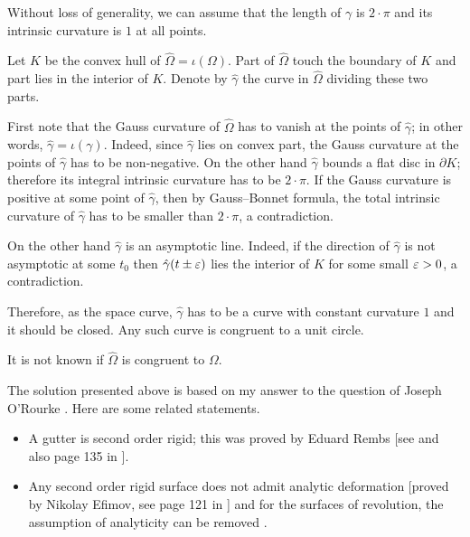 Without loss of generality, we can assume that the length of $\gamma$ is $2{\cdot}\pi$ and its intrinsic curvature is $1$ at all points.

Let $K$ be the convex hull of $\hat\Omega=\iota(\Omega)$.
Part of $\hat\Omega$ touch the boundary of $K$ and part lies in the interior of $K$. 
Denote by $\hat\gamma$ the curve in $\hat\Omega$ dividing these two parts.

First note that the Gauss curvature of $\hat\Omega$ has to vanish at the points of $\hat\gamma$;
in other words, $\hat\gamma=\iota(\gamma)$.
Indeed, since $\hat\gamma$ lies on convex part, 
the Gauss curvature at the points of $\hat\gamma$ has to be non-negative. 
On the other hand $\hat\gamma$ bounds a flat disc in $\partial K$;
therefore its integral intrinsic curvature has to be $2{\cdot}\pi$.
If the Gauss curvature is positive at some point of $\hat\gamma$, 
then by Gauss--Bonnet formula, the total intrinsic curvature of $\hat\gamma$ has to be smaller than $2{\cdot}\pi$, a contradiction.

On the other hand $\hat\gamma$ is an asymptotic line.
Indeed, if the direction of $\hat\gamma$ is not asymptotic at some $t_0$
then $\hat\gamma(t\pm\varepsilon)$ lies the interior of $K$ for some small $\varepsilon>0$, a contradiction.

Therefore, as the space curve,
$\hat\gamma$ has to be a curve with constant curvature $1$ and it should be closed.
Any such curve is congruent to a unit circle.\qeds

It is not known if $\hat\Omega$ is congruent to $\Omega$.

The solution presented above is based on my answer 
to the question of Joseph O'Rourke \cite[see][]{rourke}.
Here are some related statements.
\begin{itemize}
\item A gutter is second order rigid;
this was proved by Eduard Rembs
[see  and also page 135 in ].
\item Any second order rigid surface does not admit analytic deformation 
[proved by Nikolay Efimov, see page 121 in ]
and for the surfaces of revolution, the assumption of analyticity can be removed 
\cite[proved by Idzhad Sabitov, see][]{sabitov}.
\end{itemize}









